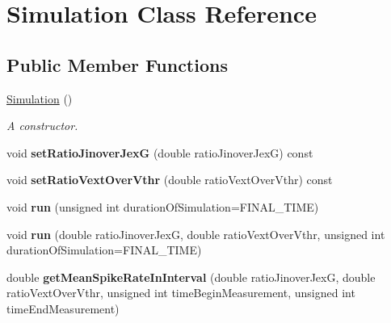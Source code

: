 \hypertarget{classSimulation}{\section{Simulation Class Reference}
\label{classSimulation}
}
\subsection*{Public Member Functions}
\begin{DoxyCompactItemize}
\item 
\hypertarget{classSimulation_a5b224cc5b36bcc8eb29689aff223de41}{\hyperlink{classSimulation_a5b224cc5b36bcc8eb29689aff223de41}{Simulation} ()}\label{classSimulation_a5b224cc5b36bcc8eb29689aff223de41}

\begin{DoxyCompactList}\small\item\em A constructor. \end{DoxyCompactList}\item 
\hypertarget{classSimulation_a73206723f84956e7d54766cec6286a1f}{void {\bfseries set\-Ratio\-Jinover\-Jex\-G} (double ratio\-Jinover\-Jex\-G) const }\label{classSimulation_a73206723f84956e7d54766cec6286a1f}

\item 
\hypertarget{classSimulation_a1d1100a36280bd45f426c82545f926bc}{void {\bfseries set\-Ratio\-Vext\-Over\-Vthr} (double ratio\-Vext\-Over\-Vthr) const }\label{classSimulation_a1d1100a36280bd45f426c82545f926bc}

\item 
\hypertarget{classSimulation_a9c9a1b5e52b447c84977990ebd545f38}{void {\bfseries run} (unsigned int duration\-Of\-Simulation=F\-I\-N\-A\-L\-\_\-\-T\-I\-M\-E)}\label{classSimulation_a9c9a1b5e52b447c84977990ebd545f38}

\item 
\hypertarget{classSimulation_a90a0c26faa720641e82fb3bc0bb2f234}{void {\bfseries run} (double ratio\-Jinover\-Jex\-G, double ratio\-Vext\-Over\-Vthr, unsigned int duration\-Of\-Simulation=F\-I\-N\-A\-L\-\_\-\-T\-I\-M\-E)}\label{classSimulation_a90a0c26faa720641e82fb3bc0bb2f234}

\item 
\hypertarget{classSimulation_acf963fa9fa6621ec7f98f743ffbd96f5}{double {\bfseries get\-Mean\-Spike\-Rate\-In\-Interval} (double ratio\-Jinover\-Jex\-G, double ratio\-Vext\-Over\-Vthr, unsigned int time\-Begin\-Measurement, unsigned int time\-End\-Measurement)}\label{classSimulation_acf963fa9fa6621ec7f98f743ffbd96f5}

\end{DoxyCompactItemize}
